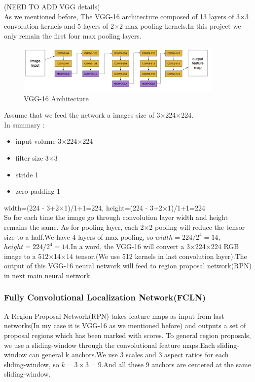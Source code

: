 \documentclass[12pt,a4paper]{report}
\begin{document}
(NEED TO ADD VGG details)\\
As we mentioned before, The VGG-16 architecture composed of 13 layers of  3$\times $3 convolution kernels and 5 layers of 2$\times$2 max pooling kernels.In this project we only remain the first four max pooling layers.

\begin{figure}[h]
\centering
\includegraphics[width=0.9\textwidth]{vgg162.png}
\caption{VGG-16 Architecture}
\end{figure}

Assume that we feed the network a images size of 3$\times$224$\times$224. \\
In summary :
\begin{itemize}
\item input volume 3$\times$224$\times$224
\item filter size 3$\times$3
\item stride 1
\item zero padding 1
\end{itemize}

width=(224 - 3+2$\times$1)/1+1=224, height=(224 - 3+2$\times$1)/1+1=224\\
So for each time the image go through convolution layer width and height remains the same. As for pooling layer, each 2$\times$2 pooling will reduce the tensor size to a half.We have 4 layers of max pooling, so $width=224/2^4=14$,$height=224/2^4=14$.In a word, the VGG-16 will convert a 3$\times$224$\times$224 RGB image to a 512$\times$14$\times$14 tensor.(We use 512 kernels in last convolution layer).The output of this VGG-16 neural network will feed to region proposal network(RPN) in next main neural network.
\subsubsection{Fully Convolutional Localization Network(FCLN)}
A Region Proposal Network(RPN) takes feature maps as input from last networks(In my case it is VGG-16 as we mentioned before) and outputs a set of proposal regions which has been marked with  scores.
To general region proposals, we use a sliding-window through the convolutional feature maps.Each sliding-window can general k anchors.We use 3 scales and 3 aspect ratios for each sliding-window, so $k=3\times 3=9$.And all these 9 anchors are centered at the same sliding-window.
\end{document}
